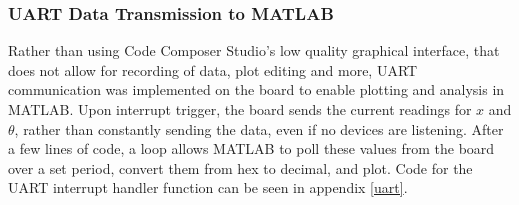\documentclass[12pt]{article}
\begin{document}
\subsubsection{UART Data Transmission to MATLAB}
Rather than using Code Composer Studio's low quality graphical interface, that does not allow for recording of data, plot editing and more, UART communication was implemented on the board to enable plotting and analysis in MATLAB. Upon interrupt trigger, the board sends the current readings for $x$ and $\theta$, rather than constantly sending the data, even if no devices are listening. After a few lines of code, a loop allows MATLAB to poll these values from the board over a set period, convert them from hex to decimal, and plot. Code for the UART interrupt handler function can be seen in appendix \ref{uart}.
\end{document}
